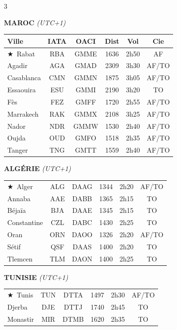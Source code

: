 \documentclass[9pt,a4paper,landscape]{article}
\newcommand{\CAP}{\textcolor{capgold}{$\bigstar$}}
\begin{document}
\begin{multicols}{3}
\scriptsize

\textbf{\color{afrgreen}MAROC} \textit{(UTC+1)}\\[-0.1cm]
\begin{tabular}{@{}l c c c c c@{}}
\toprule
\textbf{Ville} & \textbf{IATA} & \textbf{OACI} & \textbf{Dist} & \textbf{Vol} & \textbf{Cie} \\
\midrule
\rowcolor{afrlight}\CAP\ Rabat & RBA & GMME & 1636 & 2h50 & AF \\
Agadir & AGA & GMAD & 2309 & 3h30 & AF/TO \\
\rowcolor{afrlight} Casablanca & CMN & GMMN & 1875 & 3h05 & AF/TO \\
Essaouira & ESU & GMMI & 2190 & 3h20 & TO \\
\rowcolor{afrlight} Fès & FEZ & GMFF & 1720 & 2h55 & AF/TO \\
Marrakech & RAK & GMMX & 2108 & 3h25 & AF/TO \\
\rowcolor{afrlight} Nador & NDR & GMMW & 1530 & 2h40 & AF/TO \\
Oujda & OUD & GMFO & 1518 & 2h35 & AF/TO \\
\rowcolor{afrlight} Tanger & TNG & GMTT & 1559 & 2h40 & AF/TO \\
\bottomrule
\end{tabular}

\vspace{0.15cm}
\textbf{\color{afrgreen}ALGÉRIE} \textit{(UTC+1)}\\[-0.1cm]
\begin{tabular}{@{}l c c c c c@{}}
\toprule
\rowcolor{afrlight}\CAP\ Alger & ALG & DAAG & 1344 & 2h20 & AF/TO \\
Annaba & AAE & DABB & 1365 & 2h15 & TO \\
\rowcolor{afrlight} Béjaïa & BJA & DAAE & 1345 & 2h15 & TO \\
Constantine & CZL & DABC & 1430 & 2h25 & TO \\
\rowcolor{afrlight} Oran & ORN & DAOO & 1326 & 2h20 & AF/TO \\
Sétif & QSF & DAAS & 1400 & 2h20 & TO \\
\rowcolor{afrlight} Tlemcen & TLM & DAON & 1400 & 2h25 & TO \\
\bottomrule
\end{tabular}

\vspace{0.15cm}
\textbf{\color{afrgreen}TUNISIE} \textit{(UTC+1)}\\[-0.1cm]
\begin{tabular}{@{}l c c c c c@{}}
\toprule
\rowcolor{afrlight}\CAP\ Tunis & TUN & DTTA & 1497 & 2h30 & AF/TO \\
Djerba & DJE & DTTJ & 1740 & 2h45 & TO \\
\rowcolor{afrlight} Monastir & MIR & DTMB & 1620 & 2h35 & TO \\
\bottomrule
\end{tabular}


\end{multicols}
\end{document}
